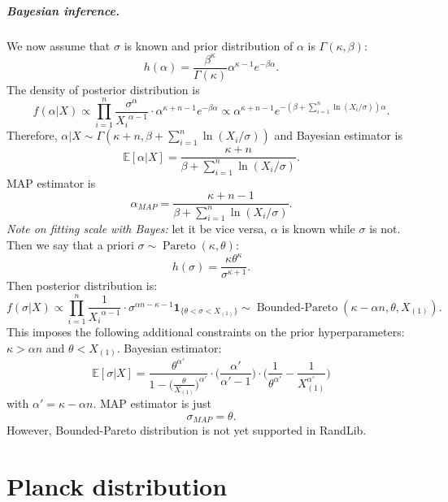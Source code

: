 \documentclass[a4paper,11pt]{article}
\theoremstyle{plain}
\theoremstyle{definition}
\newcommand{\ME}{\mathbb{E}}
\begin{document}
\subparagraph{Bayesian inference.} We now assume that $\sigma$ is known and prior distribution of $\alpha$ is $\Gamma(\kappa, \beta)$:
\[
h(\alpha) = \frac{\beta^\kappa}{\Gamma(\kappa)} \alpha^{\kappa-1}e^{-\beta \alpha}.
\]
The density of posterior distribution is
\[
f(\alpha | X) \propto \prod_{i=1}^n \frac{\sigma^\alpha}{{X_i}^{\alpha-1}} \cdot \alpha^{\kappa+n-1}e^{-\beta \alpha} \propto \alpha^{\kappa+n-1} e^{ -(\beta + \sum_{i=1}^n \ln (X_i/\sigma))\alpha }.
\]
Therefore, $\alpha |X \sim \Gamma(\kappa + n, \beta +\sum_{i=1}^n \ln (X_i/\sigma))$ and Bayesian estimator is
\[ \ME[\alpha | X] = \frac{\kappa + n}{ \beta +\sum_{i=1}^n \ln (X_i/\sigma) }. \]
MAP estimator is
\[ \alpha_{MAP} = \frac{\kappa + n-1}{ \beta +\sum_{i=1}^n \ln (X_i/\sigma) }. \]
\textit{Note on fitting scale with Bayes:} let it be vice versa, $\alpha$ is known while $\sigma$ is not. Then we say that a priori $\sigma \sim \operatorname{Pareto}(\kappa, \theta)$:
\[
h(\sigma) = \frac{\kappa\theta^\kappa}{\sigma^{\kappa+1}}.
\]
Then posterior distribution is:
\[
f(\sigma|X) \propto \prod_{i=1}^n \frac{1}{{X_i}^{\alpha-1}} \cdot \sigma^{\alpha n - \kappa - 1} \mathbf{1}_{ \{ \theta < \sigma < X_{(1)}\} } \sim \operatorname{Bounded-Pareto}(\kappa-\alpha n, \theta, X_{(1)}).
\]
This imposes the following additional constraints on the prior hyperparameters: $\kappa > \alpha n$ and $\theta < X_{(1)}$. Bayesian estimator:
\[
\ME[\sigma|X] = \frac{\theta^{\alpha'}}{1-\Big(\frac{\theta}{X_{(1)}}\Big)^{\alpha'}} \cdot \Big(\frac{\alpha'}{\alpha'-1}\Big)\cdot \bigg( \frac{1}{\theta^{\alpha'}} -\frac{1}{X_{(1)}^{\alpha'}} \bigg)
\]
with $\alpha'=\kappa - \alpha n$.
MAP estimator is just
\[
\sigma_{MAP} = \theta.
\]
However, Bounded-Pareto distribution is not yet supported in RandLib.

	
	\pagebreak
	\section{Planck distribution}
	
\end{document}

